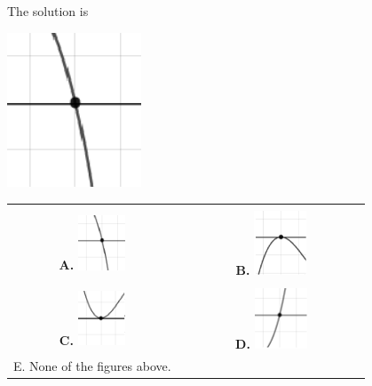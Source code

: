 \documentclass{extbook}[14pt]
\begin{document}
 
 The solution is  
 \begin{center} \includegraphics[width=0.3\textwidth]{../Figures/polyZeroBehaviorAC.png} \end{center}\begin{tabular}{|c|c|} 
\hline 
 & \tabularnewline 
 \textbf{A.} \includegraphics[width=0.3\textwidth]{../Figures/polyZeroBehaviorAC.png} & \textbf{B.} \includegraphics[width=0.3\textwidth]{../Figures/polyZeroBehaviorBC.png} \tabularnewline 
\hline 
 & \tabularnewline 
 \textbf{C.} \includegraphics[width=0.3\textwidth]{../Figures/polyZeroBehaviorCC.png} & \textbf{D.} \includegraphics[width=0.3\textwidth]{../Figures/polyZeroBehaviorDC.png} \tabularnewline 
\hline 
 E. None of the figures above. & \tabularnewline 
\hline 
 \end{tabular} 
 
\end{document}
